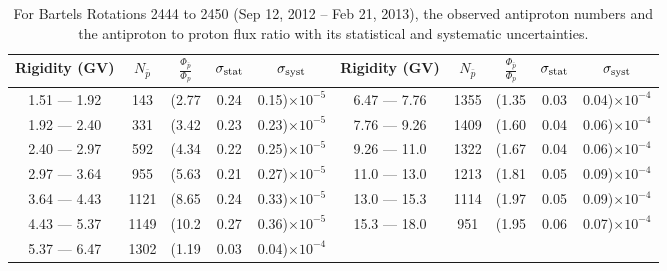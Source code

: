 \begin{table}[p] 
\renewcommand\baselinestretch{1.3}\selectfont
\setlength\tabcolsep{3pt}
\centering
\begin{tabular}{ccccc | ccccc}
\hline
\textbf{Rigidity}  (GV)  & $N_{\bar{p}}$ & $\frac{\Phi_{\bar{p}}}{\Phi_{p}}$ & $\sigma_{\rm{stat}}$ & $\sigma_{\rm{syst}}$ \hspace{1cm}   & \textbf{Rigidity}  (GV)  & $N_{\bar{p}}$ & $\frac{\Phi_{\bar{p}}}{\Phi_{p}}$ & $\sigma_{\rm{stat}}$ & $\sigma_{\rm{syst}}$ \hspace{1cm} \\ 
\hline
1.51 — 1.92   &  143                &(2.77                          &  0.24              &      0.15)$\times 10^{-5}$  & 6.47 — 7.76                &  1355                    &(1.35                                &  0.03                   &      0.04)$\times 10^{-4}$\\
1.92 — 2.40   &  331                &(3.42                          &  0.23              &      0.23)$\times 10^{-5}$  & 7.76 — 9.26                &  1409                    &(1.60                                &  0.04                   &      0.06)$\times 10^{-4}$\\
2.40 — 2.97   &  592                &(4.34                          &  0.22              &      0.25)$\times 10^{-5}$  & 9.26 — 11.0                &  1322                    &(1.67                                &  0.04                   &      0.06)$\times 10^{-4}$\\    
2.97 — 3.64   &  955                &(5.63                          &  0.21              &      0.27)$\times 10^{-5}$  & 11.0 — 13.0                 &  1213                    &(1.81                                &  0.05                   &      0.09)$\times 10^{-4}$\\    
3.64 — 4.43   &  1121              &(8.65                          &  0.24              &      0.33)$\times 10^{-5}$  & 13.0 — 15.3               &  1114                    &(1.97                                &  0.05                   &      0.09)$\times 10^{-4}$\\
4.43 — 5.37   &  1149              &(10.2                          &  0.27              &      0.36)$\times 10^{-5}$  & 15.3 — 18.0               &  951                     &(1.95                               &  0.06                     &      0.07)$\times 10^{-4}$\\
5.37 — 6.47   &  1302              &(1.19                          &  0.03              &      0.04)$\times 10^{-4}$  & \\
\hline
\end{tabular}
\caption[Antiproton to proton flux ratio for Bartels Rotations 2444 to 2450]{For Bartels Rotations 2444 to 2450 (Sep 12, 2012 – Feb 21, 2013), the observed antiproton numbers and the antiproton to proton flux ratio with its statistical and systematic uncertainties.}
\label{TableOfDependent4}
\end{table}

